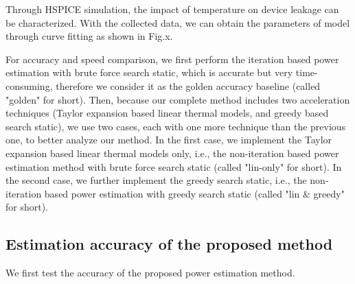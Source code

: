 Through HSPICE simulation, the impact of temperature on device leakage can be characterized. With the collected data, we can obtain the parameters of model through curve fitting as shown in Fig.x.

For accuracy and speed comparison, we first perform the iteration based power estimation with brute force search static, which is accurate but very time-consuming, therefore we consider it as the golden accuracy baseline (called "golden" for short). Then, because our complete method includes two acceleration techniques (Taylor expansion based linear thermal models, and greedy based search static), we use two cases, each with one more technique than the previous one, to better analyze our method. In the first case, we implement the Taylor expansion based linear thermal models only, i.e., the non-iteration based power estimation method with brute force search static (called "lin-only" for short). In the second case, we further implement the greedy search static, i.e., the non-iteration based power estimation with greedy search static (called "lin & greedy" for short).

\subsection{Estimation accuracy of the proposed method}
We first test the accuracy of the proposed power estimation method.
